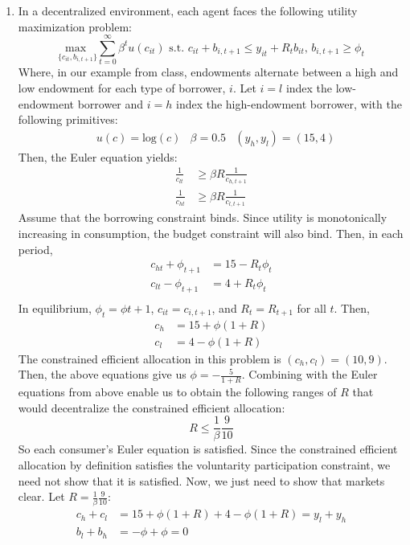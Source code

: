 \documentclass{article}
\newcommand{\loge}[1]{\text{log}\left(#1\right)}
\newcommand{\usmax}[1]{\underset{#1}{\text{max }}}
\begin{document}
\begin{enumerate}
	\item In a decentralized environment, each agent faces the following utility maximization problem:
		\[
			\usmax{\{c_{it},b_{i,t+1}\}}\sum_{t=0}^\infty\beta^tu(c_{it})\text{ s.t. }c_{it}+b_{i,t+1}\leq y_{it} + R_tb_{it}\text{, }b_{i,t+1}\geq\phi_t
		\]
		Where, in our example from class, endowments alternate between a high and low endowment for each type of borrower, $i$. Let ${i=l}$ index the low-endowment borrower and ${i=h}$ index the high-endowment borrower, with the following primitives:
		\begin{align*}
			&u(c) = \loge{c} &\beta = 0.5 &(y_h,y_l) = (15,4)
		\end{align*}
		Then, the Euler equation yields:
		\begin{align*}
			\frac{1}{c_{lt}}	&\geq \beta R\frac{1}{c_{h,t+1}}	\\
			\frac{1}{c_{ht}}	&\geq \beta R\frac{1}{c_{l,t+1}}
		\end{align*}
		Assume that the borrowing constraint binds. Since utility is monotonically increasing in consumption, the budget constraint will also bind. Then, in each period,
		\begin{align*}
			c_{ht} + \phi_{t+1} &= 15 - R_t\phi_t	\\
			c_{lt} - \phi_{t+1} &= 4 + R_t\phi_t	\\
		\end{align*}
		In equilibrium, ${\phi_t=\phi{t+1}}$, ${c_{it}=c_{i,t+1}}$, and ${R_t = R_{t+1}}$ for all $t$. Then,
		\begin{align*}
			c_{h}	&= 15 + \phi(1+R)	\\
			c_{l} 	&= 4 - \phi(1+R)		
		\end{align*}
		The constrained efficient allocation in this problem is ${(c_h,c_l)=(10,9)}$. Then, the above equations give us ${\phi=-\frac{5}{1+R}}$. Combining with the Euler equations from above enable us to obtain the following ranges of $R$ that would decentralize the constrained efficient allocation:
		\[
			R\leq \frac{1}{\beta}\frac{9}{10}
		\]
		So each consumer's Euler equation is satisfied. Since the constrained efficient allocation by definition satisfies the voluntarity participation constraint, we need not show that it is satisfied. Now, we just need to show that markets clear. Let ${R=\frac{1}{\beta}\frac{9}{10}}$:
		\begin{align*}
			c_{h} + c_l	&= 15 + \phi(1+R) + 4 - \phi(1+R) = y_l + y_h	\\
			b_l + b_h	&= -\phi + \phi = 0
		\end{align*}
		

\end{enumerate}
\end{document}
